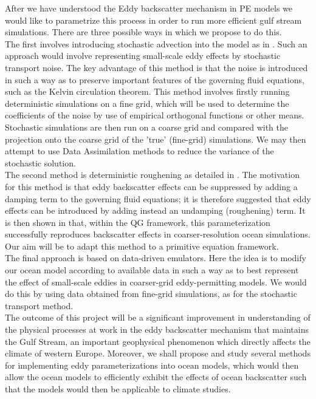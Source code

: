 \documentclass[10pt]{article}
\begin{document}
\linebreak
After we have understood the Eddy backscatter mechanism in PE models we would like to parametrize this process in order to run more efficient gulf stream simulations. There are three possible ways in which we propose to do this. \\
\linebreak
The first involves introducing stochastic advection into the model as in \cite{ii}. Such an approach would involve representing small-scale eddy effects by stochastic transport noise. The key advantage of this method is that the noise is introduced in such a way as to preserve important features of the governing fluid equations, such as the Kelvin circulation theorem. This method involves firstly running deterministic simulations on a fine grid, which will be used to determine the coefficients of the noise by use of empirical orthogonal functions or other means. Stochastic simulations are then run on a coarse grid and compared with the projection onto the coarse grid of the 'true' (fine-grid) simulations. We may then attempt to use Data Assimilation methods to reduce the variance of the stochastic solution.\\
\linebreak
The second method is deterministic roughening as detailed in \cite{i}. The motivation for this method is that eddy backscatter effects can be suppressed by adding a damping term to the governing fluid equations; it is therefore suggested that eddy effects can be introduced by adding instead an undamping (roughening) term. It is then shown in \cite{i} that, within the QG framework, this parameterization successfully reproduces backscatter effects in coarser-resolution ocean simulations. Our aim will be to adapt this method to a primitive equation framework. \\
\linebreak
The final approach is based on data-driven emulators. Here the idea is to modify our ocean model according to available data in such a way as to best represent the effect of small-scale eddies in coarser-grid eddy-permitting models. We would do this by using data obtained from fine-grid simulations, as for the stochastic transport method. \\
\linebreak
The outcome of this project will be a significant improvement in understanding of the physical processes at work in the eddy backscatter mechanism that maintains the Gulf Stream, an important geophysical phenomenon which directly affects the climate of western Europe. Moreover, we shall propose and study several methods for implementing eddy parameterizations into ocean models, which would then allow the ocean models to efficiently exhibit the effects of ocean backscatter such that the models would then be applicable to climate studies. 
\end{document}
